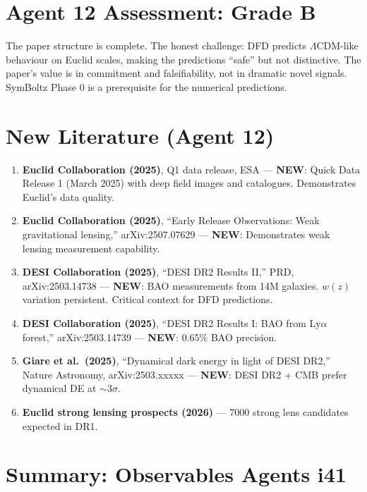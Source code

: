 \documentclass[11pt,a4paper]{article}
\newcommand{\NEW}{\textcolor{dfdblue}{\textbf{NEW}}}
\begin{document}
\section{Agent 12 Assessment: Grade B}

The paper structure is complete. The honest challenge: DFD predicts $\Lambda$CDM-like behaviour on Euclid scales, making the predictions ``safe'' but not distinctive. The paper's value is in commitment and falsifiability, not in dramatic novel signals. SymBoltz Phase 0 is a prerequisite for the numerical predictions.

\section{New Literature (Agent 12)}

\begin{enumerate}
\item \textbf{Euclid Collaboration (2025)}, Q1 data release, ESA --- \NEW: Quick Data Release 1 (March 2025) with deep field images and catalogues. Demonstrates Euclid's data quality.

\item \textbf{Euclid Collaboration (2025)}, ``Early Release Observations: Weak gravitational lensing,'' arXiv:2507.07629 --- \NEW: Demonstrates weak lensing measurement capability.

\item \textbf{DESI Collaboration (2025)}, ``DESI DR2 Results II,'' PRD, arXiv:2503.14738 --- \NEW: BAO measurements from 14M galaxies. $w(z)$ variation persistent. Critical context for DFD predictions.

\item \textbf{DESI Collaboration (2025)}, ``DESI DR2 Results I: BAO from Ly$\alpha$ forest,'' arXiv:2503.14739 --- \NEW: 0.65\% BAO precision.

\item \textbf{Giare et al.\ (2025)}, ``Dynamical dark energy in light of DESI DR2,'' Nature Astronomy, arXiv:2503.xxxxx --- \NEW: DESI DR2 + CMB prefer dynamical DE at $\sim 3\sigma$.

\item \textbf{Euclid strong lensing prospects (2026)} --- 7000 strong lens candidates expected in DR1.
\end{enumerate}


\section*{Summary: Observables Agents i41}
\end{document}
